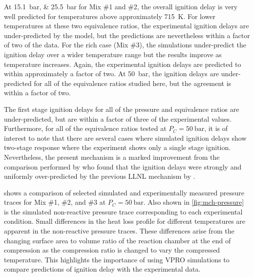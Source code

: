 \documentclass[../main.tex]{subfiles}
\begin{document}
At \SIlist{15.1;25.5}{\bar} for Mix \#1 and \#2, the overall ignition delay is very
well predicted for temperatures above approximately \SI{715}{\kelvin}. For lower
temperatures at these two equivalence ratios, the experimental ignition delays
are under-predicted by the model, but the predictions are nevertheless within
a factor of two of the data. For the rich case (Mix \#3), the simulations
under-predict the ignition delay over a wider temperature range but the results
improve as temperature increases. Again, the experimental ignition delays are
predicted to within approximately a factor of two. At \SI{50}{\bar}, the ignition
delays are under-predicted for all of the equivalence ratios studied here, but
the agreement is within a factor of two.

The first stage ignition delays for all of the pressure and equivalence ratios
are under-predicted, but are within a factor of three of the experimental
values. Furthermore, for all of the equivalence ratios tested at $P_C=\SI{50}{\bar}$,
it is of interest to note that there are several cases where simulated ignition
delays show two-stage response where the experiment shows only a single stage
ignition. Nevertheless, the present mechanism is a marked improvement from the
comparison performed by \textcite{Mittal2009} who found that the ignition
delays were strongly and uniformly over-predicted by the previous LLNL
mechanism by \textcite{Pitz2007}.

 shows a comparison of selected simulated and
experimentally measured pressure traces for Mix \#1, \#2, and \#3 at
$P_C=\SI{50}{\bar}$. Also shown in \cref{fig:mch-pressure} is the
simulated non-reactive pressure trace corresponding to each experimental
condition. Small differences in the heat loss profile for different
temperatures are apparent in the non-reactive pressure traces. These
differences arise from the changing surface area to volume ratio of the
reaction chamber at the end of compression as the compression ratio is changed
to vary the compressed temperature. This highlights the importance of using
VPRO simulations to compare predictions of ignition delay with the experimental data.
\end{document}
